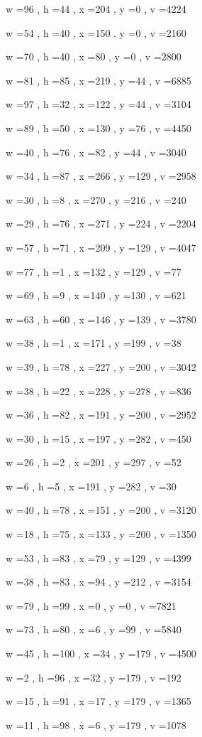 \documentclass[11pt]{article}
\begin{document}
w =96 , h =44 , x =204 , y =0 , v =4224
\par
w =54 , h =40 , x =150 , y =0 , v =2160
\par
w =70 , h =40 , x =80 , y =0 , v =2800
\par
w =81 , h =85 , x =219 , y =44 , v =6885
\par
w =97 , h =32 , x =122 , y =44 , v =3104
\par
w =89 , h =50 , x =130 , y =76 , v =4450
\par
w =40 , h =76 , x =82 , y =44 , v =3040
\par
w =34 , h =87 , x =266 , y =129 , v =2958
\par
w =30 , h =8 , x =270 , y =216 , v =240
\par
w =29 , h =76 , x =271 , y =224 , v =2204
\par
w =57 , h =71 , x =209 , y =129 , v =4047
\par
w =77 , h =1 , x =132 , y =129 , v =77
\par
w =69 , h =9 , x =140 , y =130 , v =621
\par
w =63 , h =60 , x =146 , y =139 , v =3780
\par
w =38 , h =1 , x =171 , y =199 , v =38
\par
w =39 , h =78 , x =227 , y =200 , v =3042
\par
w =38 , h =22 , x =228 , y =278 , v =836
\par
w =36 , h =82 , x =191 , y =200 , v =2952
\par
w =30 , h =15 , x =197 , y =282 , v =450
\par
w =26 , h =2 , x =201 , y =297 , v =52
\par
w =6 , h =5 , x =191 , y =282 , v =30
\par
w =40 , h =78 , x =151 , y =200 , v =3120
\par
w =18 , h =75 , x =133 , y =200 , v =1350
\par
w =53 , h =83 , x =79 , y =129 , v =4399
\par
w =38 , h =83 , x =94 , y =212 , v =3154
\par
w =79 , h =99 , x =0 , y =0 , v =7821
\par
w =73 , h =80 , x =6 , y =99 , v =5840
\par
w =45 , h =100 , x =34 , y =179 , v =4500
\par
w =2 , h =96 , x =32 , y =179 , v =192
\par
w =15 , h =91 , x =17 , y =179 , v =1365
\par
w =11 , h =98 , x =6 , y =179 , v =1078
\par
\newpage
\end{document}

